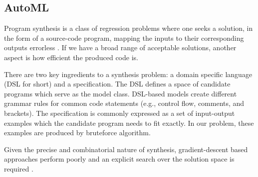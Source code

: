 \documentclass[format=acmsmall,screen,review,authordraft,nonacm]{acmart}
\begin{document}
\subsection{AutoML} %


Program synthesis is a class of regression problems where one seeks a solution,
in the form of a source-code program, mapping the inputs to their corresponding
outputs errorless \citep{pu2018selecting}.  If we have a broad range of
acceptable solutions, another aspect is how efficient the produced code is.

There are two key ingredients to a synthesis problem: a domain specific language
(DSL for short) and a specification. The DSL defines a space of candidate
programs which serve as the model class. DSL-based models create different
grammar rules for common code statements (e.g., control flow, comments, and
brackets).  The specification is commonly expressed as a set of input-output
examples which the candidate program needs to fit exactly. In our problem, these
examples are produced by bruteforce algorithm.

Given the precise and combinatorial nature of synthesis, gradient-descent based
approaches perform poorly and an explicit search over the solution space is
required \citep{balog2016deepcoder}.




\end{document}
